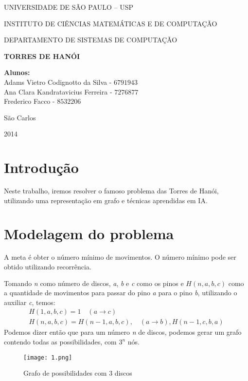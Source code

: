 \documentclass[10pt,a4paper]{article}
\begin{document}
\thispagestyle{empty}
\begin{center}
	UNIVERSIDADE DE SÃO PAULO – USP
	
	INSTITUTO DE CIÊNCIAS MATEMÁTICAS E DE COMPUTAÇÃO
	
	DEPARTAMENTO DE SISTEMAS DE COMPUTAÇÃO
	
	\vspace{7cm}
	
	\Large{\textbf{TORRES DE HANÓI}}
	
	\vspace{6cm}
	
    \textbf{Alunos:}\\
	Adams Vietro Codignotto da Silva - $6791943$ \\ 
    Ana Clara Kandratavicius Ferreira - $7276877$\\
    Frederico Facco - $8532206$\\
	 
	\vspace{6cm}
	
	São Carlos
	
	2014
\end{center}

\newpage


\section{Introdução}
Neste trabalho, iremos resolver o famoso problema das Torres de Hanói, utilizando uma representação em grafo e técnicas aprendidas em IA.
\section{Modelagem do problema}
A meta é obter o número mínimo de movimentos. O número mínimo pode ser obtido utilizando recorrência.

Tomando \textit{n} como número de discos, \textit{a}, \textit{b} e \textit{c} como os pinos e $H(n,a,b,c)$ como a quantidade de movimentos para passar do pino \textit{a} para o pino \textit{b}, utilizando o auxiliar \textit{c}, temos:
\begin{equation}
\nonumber
\begin{array}{l}
H(1,a,b,c) = 1 \quad (a \rightarrow c)\\
H(n,a,b,c) = H(n-1,a,b,c), \quad (a \rightarrow b), H(n-1,c,b,a)
\end{array}
\end{equation}
Podemos dizer então que para um número \textit{n} de discos, podemos gerar um grafo contendo todas as possibilidades, com $3^n$ nós.
\begin{figure}[H]
\centering
\texttt{[image: 1.png]}
\caption*{\small{Grafo de possibilidades com 3 discos}}
\end{figure}
\end{document}
